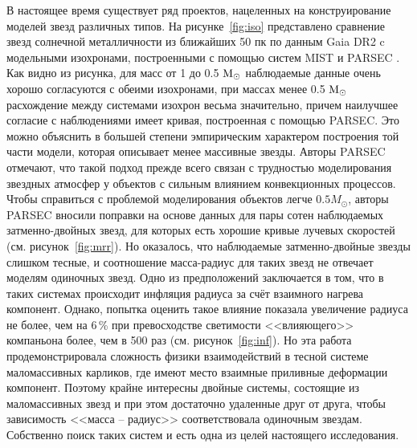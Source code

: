 В настоящее время существует ряд проектов, нацеленных на конструирование моделей звезд различных типов. На рисунке~\ref{fig:iso} представлено сравнение звезд солнечной металличности из ближайших 50 пк по данным Gaia DR2 c модельными изохронами, построенными с помощью систем MIST \cite{2016ApJ...823..102C} и PARSEC \cite{2012MNRAS.427..127B}. Как видно из рисунка, для масс от 1 до 0.5 \(\textup{M}_\odot\) наблюдаемые данные очень хорошо согласуются с обеими изохронами, при массах менее 0.5 \(\textup{M}_\odot\) расхождение между системами изохрон весьма значительно, причем наилучшее согласие с наблюдениями имеет кривая, построенная с помощью PARSEC. Это можно объяснить в большей степени эмпирическим характером построения той части модели, которая описывает менее массивные звезды. Авторы PARSEC отмечают, что такой подход прежде всего связан с трудностью моделирования звездных атмосфер у объектов с сильным влиянием конвекционных процессов. Чтобы справиться с проблемой моделирования объектов легче $0.5 M_\odot$, авторы PARSEC вносили поправки на основе данных для пары сотен наблюдаемых затменно-двойных звезд, для которых есть хорошие кривые лучевых скоростей (см. рисунок~\ref{fig:mrr}). Но оказалось, что наблюдаемые затменно-двойные звезды слишком тесные, и соотношение масса-радиус для таких звезд не отвечает моделям одиночных звезд. Одно из предположений заключается в том, что в таких системах происходит инфляция радиуса за счёт взаимного нагрева компонент. Однако, попытка оценить такое влияние показала увеличение радиуса не более, чем на 6\,\%  при превосходстве светимости <<влияющего>> компаньона более, чем в 500 раз (см. рисунок~\ref{fig:inf}). Но эта работа продемонстрировала сложность физики взаимодействий в тесной системе маломассивных карликов, где имеют место  взаимные приливные деформации компонент. Поэтому крайне интересны двойные системы, состоящие из маломассивных звезд и при этом достаточно удаленные друг от друга, чтобы зависимость <<масса -- радиус>> соответствовала одиночным звездам. Собственно поиск таких систем и есть одна из целей настоящего исследования.

